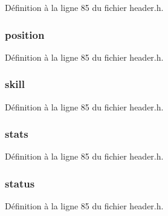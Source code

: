 Définition à la ligne 85 du fichier header.\+h.

\hypertarget{structt__character_a27c93348dcaa3ea78282fb5ef6ce371b}{
\subsubsection[{position}]{ position}}\label{structt__character_a27c93348dcaa3ea78282fb5ef6ce371b}


Définition à la ligne 85 du fichier header.\+h.

\hypertarget{structt__character_ae7aa14804e69b1bc9652c16261da0c9f}{
\subsubsection[{skill}]{ skill}}\label{structt__character_ae7aa14804e69b1bc9652c16261da0c9f}


Définition à la ligne 85 du fichier header.\+h.

\hypertarget{structt__character_a29711825af64d428d19df366a5056670}{
\subsubsection[{stats}]{ stats}}\label{structt__character_a29711825af64d428d19df366a5056670}


Définition à la ligne 85 du fichier header.\+h.

\hypertarget{structt__character_a3ade6b90793e915ca28b52fb70e58e3f}{
\subsubsection[{status}]{ status}}\label{structt__character_a3ade6b90793e915ca28b52fb70e58e3f}


Définition à la ligne 85 du fichier header.\+h.

